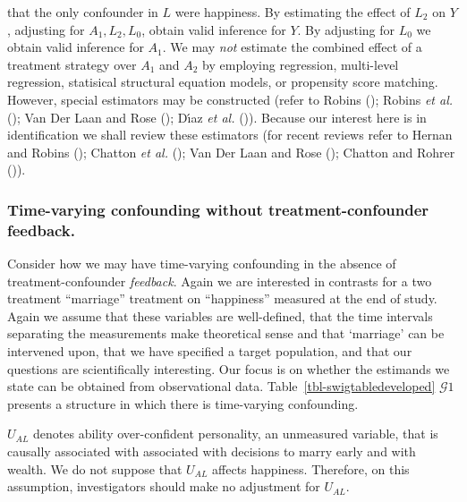 \documentclass[
  single column]{article}
\begin{document}
that the only confounder in \(L\) were happiness. By estimating the
effect of \(L_2\) on \(Y\), adjusting for \(A_1, L_2, L_0\), obtain
valid inference for \(Y\). By adjusting for \(L_0\) we obtain valid
inference for \(A_1\). We may \emph{not} estimate the combined effect of
a treatment strategy over \(A_1\) and \(A_2\) by employing regression,
multi-level regression, statisical structural equation models, or
propensity score matching. However, special estimators may be
constructed (refer to Robins (); Robins
\emph{et al.} (); Van Der Laan and
Rose (); Dı́az \emph{et al.}
()). Because our interest here
is in identification we shall review these estimators (for recent
reviews refer to Hernan and Robins
(); Chatton \emph{et al.}
(); Van Der Laan and Rose
(); Chatton and Rohrer
()).

\subsubsection{Time-varying confounding without treatment-confounder
feedback.}\label{time-varying-confounding-without-treatment-confounder-feedback.}

Consider how we may have time-varying confounding in the absence of
treatment-confounder \emph{feedback}. Again we are interested in
contrasts for a two treatment ``marriage'' treatment on ``happiness''
measured at the end of study. Again we assume that these variables are
well-defined, that the time intervals separating the measurements make
theoretical sense and that `marriage' can be intervened upon, that we
have specified a target population, and that our questions are
scientifically interesting. Our focus is on whether the estimands we
state can be obtained from observational data.
Table~\ref{tbl-swigtabledeveloped} \(\mathcal{G}1\) presents a structure
in which there is time-varying confounding.

\(U_{AL}\) denotes ability over-confident personality, an unmeasured
variable, that is causally associated with associated with decisions to
marry early and with wealth. We do not suppose that \(U_{AL}\) affects
happiness. Therefore, on this assumption, investigators should make no
adjustment for \(U_{AL}\).
\end{document}
